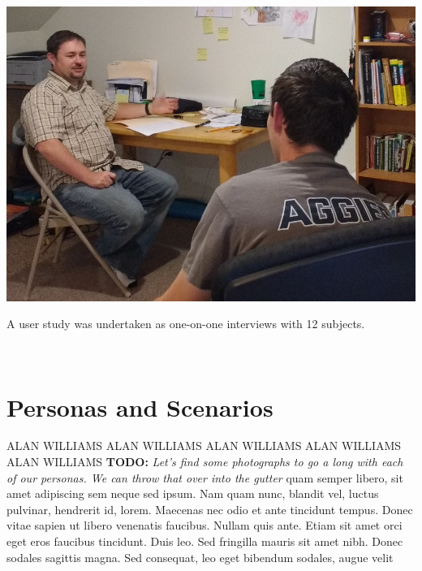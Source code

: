 \documentclass{sigchi-ext}
\begin{document}
\begin{marginfigure}[-15pc]
  \begin{minipage}{\marginparwidth}
    \centering
    \includegraphics[width=0.9\marginparwidth]{figures/user_study.jpg}
    \caption{A user study was undertaken as one-on-one interviews with 12 subjects.}~\label{fig:marginfig}
  \end{minipage}
\end{marginfigure}



\section{Personas and Scenarios}
ALAN WILLIAMS ALAN WILLIAMS ALAN WILLIAMS ALAN WILLIAMS ALAN WILLIAMS 
\textbf{TODO:}
\textit{Let's find some photographs to go a long with each of our personas.
We can throw that over into the gutter}
quam semper libero, sit amet adipiscing sem neque sed ipsum. Nam quam
nunc, blandit vel, luctus pulvinar, hendrerit id, lorem. Maecenas nec
odio et ante tincidunt tempus. Donec vitae sapien ut libero venenatis
faucibus. Nullam quis ante. Etiam sit amet orci eget eros faucibus
tincidunt. Duis leo. Sed fringilla mauris sit amet nibh. Donec sodales
sagittis magna. Sed consequat, leo eget bibendum sodales, augue velit

\end{document}
